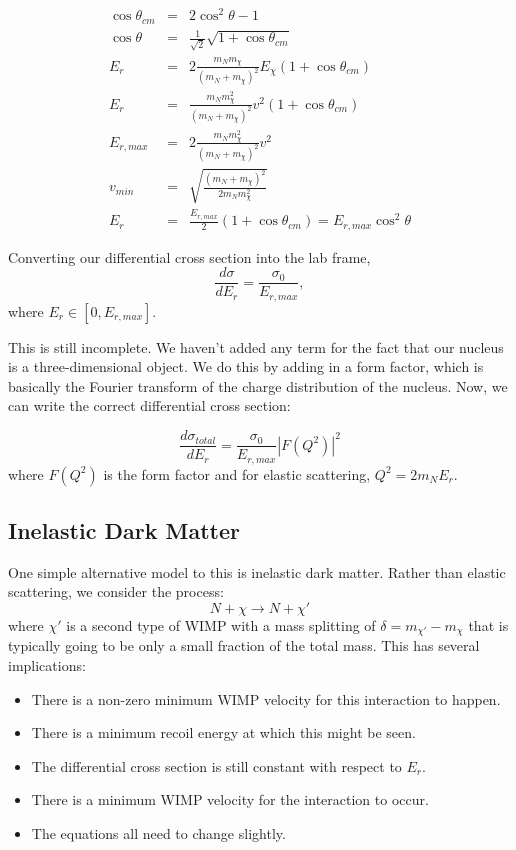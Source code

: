 \documentclass{article}
\begin{document}
\begin{eqnarray}
\cos\theta_{cm} &=& 2 \cos^2\theta - 1 \\
\cos\theta &=& \frac{1}{\sqrt{2}}\sqrt{1+\cos\theta_{cm}} \\
E_r &=& 2 \frac{m_N m_\chi}{(m_N+m_\chi)^2}E_\chi(1+\cos\theta_{cm}) \\
E_r &=& \frac{m_N m_\chi^2}{(m_N+m_\chi)^2}v^2(1+\cos\theta_{cm}) \\
E_{r,max} &=& 2\frac{m_N m_\chi^2}{(m_N+m_\chi)^2}v^2 \\
v_{min} &=& \sqrt{\frac{(m_N + m_\chi)^2}{2m_Nm_\chi^2}} \\
E_{r} &=& \frac{E_{r,max}}{2}(1+\cos\theta_{cm}) = E_{r,max}\cos^2\theta
\end{eqnarray}

Converting our differential cross section into the lab frame,
\begin{equation}
\frac{d\sigma}{dE_r } = \frac{\sigma_0}{E_{r,max}},
\end{equation}
where $E_r \in [0,E_{r,max}]$.

This is still incomplete. We haven't added any term for the fact that our nucleus is a three-dimensional
object. We do this by adding in a form factor, which is basically the Fourier transform of the 
charge distribution of the nucleus. Now, we can write the correct differential cross section:

\begin{equation}
\frac{d\sigma_{total}}{dE_r} = \frac{\sigma_0}{E_{r,max}} | F(Q^2) |^2
\end{equation}
where $F(Q^2)$ is the form factor and for elastic scattering, $Q^2 = 2m_N E_r$.

\subsection{Inelastic Dark Matter}

One simple alternative model to this is inelastic dark matter.
Rather than elastic scattering, we consider the process:
\begin{equation}
N + \chi \longrightarrow N + \chi'
\end{equation}
where $\chi'$ is a second type of WIMP with a mass splitting of $\delta = m_{\chi'} - m_\chi$ that
is typically going to be only a small fraction of the total mass.
This has several implications:
\begin{itemize}
\item There is a non-zero minimum WIMP velocity for this interaction to happen.
\item There is a minimum recoil energy at which this might be seen.
\item The differential cross section is still constant with respect to $E_r$.
\item There is a minimum WIMP velocity for the interaction to occur.
\item The equations all need to change slightly.
\end{itemize}
\end{document}
